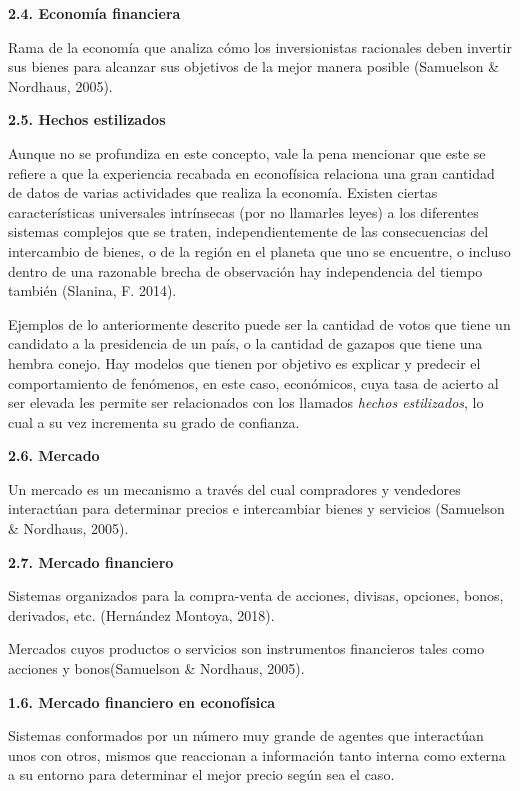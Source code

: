 {
\Large  \textbf{2.4. Economía financiera} 
}

Rama de la economía que analiza cómo los inversionistas racionales deben invertir sus bienes para alcanzar sus objetivos de la mejor manera posible  (Samuelson \& Nordhaus, 2005).
\newline

{
\Large  \textbf{2.5. Hechos estilizados} 
}

Aunque no se profundiza en este concepto, vale la pena mencionar que este  se refiere a que la experiencia recabada en econofísica relaciona una gran cantidad de datos de varias actividades que realiza la economía. Existen ciertas características universales intrínsecas (por no llamarles leyes) a los diferentes sistemas complejos que se traten, independientemente de las consecuencias del intercambio de bienes, o de la región en el planeta que uno se encuentre, o incluso dentro de una razonable brecha de observación hay independencia del tiempo también (Slanina, F. 2014). 
\newline

Ejemplos de lo anteriormente descrito puede ser la cantidad de votos que tiene un candidato a la presidencia de un país, o la cantidad de gazapos que tiene una hembra conejo. Hay modelos que tienen por objetivo es explicar y predecir el comportamiento de fenómenos, en este caso, económicos, cuya tasa de acierto al ser elevada les permite ser relacionados con los llamados \textit{hechos estilizados}, lo cual a su vez incrementa su grado de confianza.    
\newline


{
\Large  \textbf{2.6. Mercado} 
}

Un mercado es un mecanismo a través del cual compradores y vendedores interactúan para determinar precios e intercambiar bienes y servicios (Samuelson \& Nordhaus, 2005).
\newpage


{
\Large  \textbf{2.7. Mercado financiero} 
}

Sistemas organizados para la compra-venta de acciones, divisas, opciones, bonos, derivados, etc. (Hernández Montoya, 2018).
\newline

Mercados cuyos productos o servicios son instrumentos financieros tales como acciones y bonos(Samuelson \& Nordhaus, 2005). 
\newline

{
\Large  \textbf{1.6. Mercado financiero en econofísica} 
}

Sistemas conformados por un número muy grande de agentes que interactúan unos con otros, mismos que reaccionan a información tanto interna como externa a su entorno para determinar el mejor precio según sea el caso.
\newline


